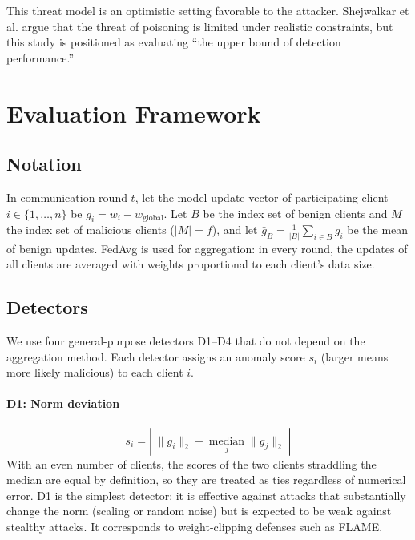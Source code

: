 \documentclass[a4paper,10pt]{article}
\begin{document}
This threat model is an optimistic setting favorable to the attacker. Shejwalkar et al.\cite{shejwalkar2022back} argue that the threat of poisoning is limited under realistic constraints, but this study is positioned as evaluating ``the upper bound of detection performance.''

\section{Evaluation Framework}
\label{sec:framework}

\subsection{Notation}

In communication round $t$, let the model update vector of participating client $i \in \{1,\dots,n\}$ be $g_i = w_i - w_{\text{global}}$. Let $B$ be the index set of benign clients and $M$ the index set of malicious clients ($|M| = f$), and let $\bar{g}_B = \frac{1}{|B|}\sum_{i \in B} g_i$ be the mean of benign updates. FedAvg\cite{mcmahan2017fedavg} is used for aggregation: in every round, the updates of all clients are averaged with weights proportional to each client's data size.

\subsection{Detectors}
\label{sec:detectors}

We use four general-purpose detectors D1--D4 that do not depend on the aggregation method. Each detector assigns an anomaly score $s_i$ (larger means more likely malicious) to each client $i$.

\paragraph{D1: Norm deviation}
\begin{equation}
s_i = \left|\; \|g_i\|_2 - \operatorname*{median}_{j}\|g_j\|_2 \;\right|
\end{equation}
With an even number of clients, the scores of the two clients straddling the median are equal by definition, so they are treated as ties regardless of numerical error. D1 is the simplest detector; it is effective against attacks that substantially change the norm (scaling or random noise) but is expected to be weak against stealthy attacks. It corresponds to weight-clipping defenses such as FLAME\cite{nguyen2022flame}.
\end{document}
